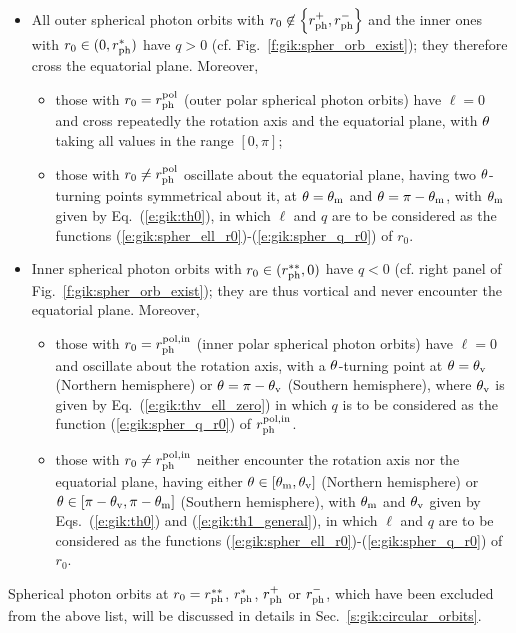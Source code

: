 \begin{greybox}
\begin{itemize}
\item All outer spherical photon orbits with $r_0\not\in \left\{r_{\rm ph}^+, r_{\rm ph}^-\right\}$ and the inner ones with $r_0\in (0, r_{\rm ph}^{*})$
have $q>0$ (cf. Fig.~\ref{f:gik:spher_orb_exist}); they therefore cross the equatorial plane.
Moreover,
\begin{itemize}
\item those with $r_0 = r_{\rm ph}^{\rm pol}$ (outer polar spherical photon orbits)
have $\ell=0$
and cross repeatedly the rotation axis and the equatorial plane, with $\theta$
taking all values in the range $[0,\pi]$;
\item those with $r_0 \neq r_{\rm ph}^{\rm pol}$
oscillate about the equatorial plane, having two $\theta$-turning points
symmetrical about it, at $\theta=\theta_{\rm m}$ and $\theta=\pi-\theta_{\rm m}$, with
$\theta_{\rm m}$ given by Eq.~(\ref{e:gik:th0}),
in which $\ell$ and $q$ are to be considered as the functions
(\ref{e:gik:spher_ell_r0})-(\ref{e:gik:spher_q_r0}) of $r_0$.
\end{itemize}
\item Inner spherical photon orbits with $r_0 \in (r_{\rm ph}^{**}, 0)$
have $q<0$ (cf. right panel of Fig.~\ref{f:gik:spher_orb_exist}); they are thus vortical
and never encounter the equatorial plane. Moreover,
\begin{itemize}
\item those with $r_0 = r_{\rm ph}^{\rm pol, in}$ (inner polar spherical photon orbits)
have $\ell=0$ and oscillate about the rotation axis,
with a $\theta$-turning point at
$\theta=\theta_{\rm v}$ (Northern hemisphere) or $\theta = \pi - \theta_{\rm v}$ (Southern hemisphere),
where $\theta_{\rm v}$
is given by Eq.~(\ref{e:gik:thv_ell_zero}) in which $q$ is to be considered
as the function (\ref{e:gik:spher_q_r0}) of $r_{\rm ph}^{\rm pol, in}$.
\item those with $r_0 \neq r_{\rm ph}^{\rm pol, in}$ neither encounter the rotation axis nor the
equatorial plane, having
either $\theta\in[\theta_{\rm m}, \theta_{\rm v}]$ (Northern hemisphere)
or $\theta\in[\pi-\theta_{\rm v}, \pi-\theta_{\rm m}]$ (Southern hemisphere), with
$\theta_{\rm m}$ and $\theta_{\rm v}$ given by Eqs.~(\ref{e:gik:th0}) and (\ref{e:gik:th1_general}), in which
$\ell$ and $q$ are to be considered as the functions
(\ref{e:gik:spher_ell_r0})-(\ref{e:gik:spher_q_r0}) of $r_0$.
\end{itemize}
\end{itemize}
Spherical photon orbits at $r_0 = r_{\rm ph}^{**}$, $r_{\rm ph}^*$, $r_{\rm ph}^+$ or $r_{\rm ph}^-$,
which have been excluded from the above list,
will be discussed in details in Sec.~\ref{s:gik:circular_orbits}.
\end{greybox}

